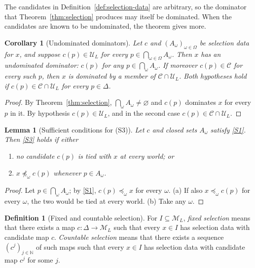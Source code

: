 \documentclass[11pt]{article}
\newtheorem{lemma}[theorem]{Lemma}
\newtheorem{corollary}[theorem]{Corollary}
\theoremstyle{definition}
\newtheorem{definition}[theorem]{Definition}
\theoremstyle{remark}
\newcommand{\M}{\mathcal M}
\newcommand{\C}{\mathcal C}
\newcommand{\U}{\mathcal U}
\begin{document}
The candidates in Definition~\ref{def:selection-data} are arbitrary, so the dominator that Theorem~\ref{thm:selection} produces may itself be dominated. When the candidates are known to be undominated, the theorem gives more.

\begin{corollary}[Undominated dominators]\label{cor:undominated-dominators}
Let $c$ and $(A_\omega)_{\omega\in\Omega}$ be selection data for $x$, and suppose $c(p)\in\U_L$ for every $p\in\bigcap_{\omega\in\Omega}A_\omega$. Then $x$ has an undominated dominator: $c(p)$ for any $p\in\bigcap_\omega A_\omega$. If moreover $c(p)\in\C$ for every such $p$, then $x$ is dominated by a member of $\C\cap\U_L$. Both hypotheses hold if $c(p)\in\C\cap\U_L$ for every $p\in\Delta$.
\end{corollary}
\begin{proof}
By Theorem~\ref{thm:selection}, $\bigcap_\omega A_\omega\neq\varnothing$ and $c(p)$ dominates $x$ for every $p$ in it. By hypothesis $c(p)\in\U_L$, and in the second case $c(p)\in\C\cap\U_L$.
\end{proof}

\begin{lemma}[Sufficient conditions for (S3)]\label{lem:S3}
Let $c$ and closed sets $A_\omega$ satisfy \ref{S1}. Then \ref{S3} holds if either
\begin{enumerate}[label=(\alph*)]
\item no candidate $c(p)$ is tied with $x$ at every world; or
\item $x\not\preceq_\omega c(p)$ whenever $p\in A_\omega$.
\end{enumerate}
\end{lemma}
\begin{proof}
Let $p\in\bigcap_\omega A_\omega$; by \ref{S1}, $c(p)\preceq_\omega x$ for every $\omega$. (a) If also $x\preceq_\omega c(p)$ for every $\omega$, the two would be tied at every world. (b) Take any $\omega$.
\end{proof}

\begin{definition}[Fixed and countable selection]
For $I\subseteq\M_L$, \emph{fixed selection} means that there exists a map $c:\Delta\to\M_L$ such that every $x\in I$ has selection data with candidate map $c$. \emph{Countable selection} means that there exists a sequence $(c^j)_{j\in\mathbb N}$ of such maps such that every $x\in I$ has selection data with candidate map $c^j$ for some $j$.
\end{definition}
\end{document}
